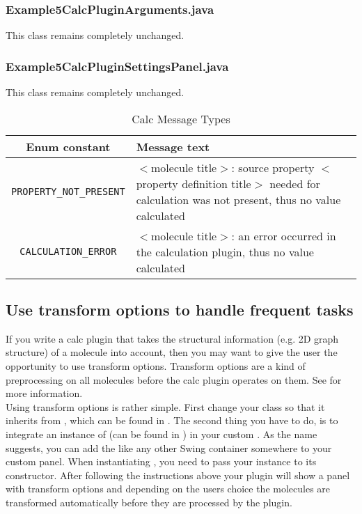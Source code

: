   \subsubsection{Example5CalcPluginArguments.java}
  This class remains completely unchanged.

  \subsubsection{Example5CalcPluginSettingsPanel.java}
  This class remains completely unchanged.

    \begin{table}[!htb]
      \begin{tabular}{cp{10cm}}
	\textbf{Enum constant}		& \textbf{Message text} \\ \toprule
	\verb+PROPERTY_NOT_PRESENT+	& $<$molecule title$>$: source property $<$property definition title$>$ needed for calculation was not present, thus no value calculated\\ \midrule
	\verb+CALCULATION_ERROR+	& $<$molecule title$>$: an error occurred in the calculation plugin, thus no value calculated\\ \bottomrule
      \end{tabular}
      \caption{Calc Message Types}
      \label{Table:scaffoldhunter:calc:CalcMessageTypes}
    \end{table}

\subsection{Use transform options to handle frequent tasks}

If you write a calc plugin that takes the structural
information (e.g. 2D graph structure) of a molecule into account,
then you may want to give the user the opportunity to use transform options.
Transform options are a kind of preprocessing on all molecules before the calc plugin operates on them.
See  for more information.\\

Using transform options is rather simple.
First change your  class
so that it inherits from ,
which can be found in .
The second thing you have to do, is to integrate an instance of 
(can be found in )
in your custom .
As the name suggests, you can add the  like any other Swing container somewhere to your custom panel.
When instantiating ,
you need to pass your  instance to its constructor.
After following the instructions above your plugin will show a panel with transform
options and depending on the users choice the molecules are transformed automatically before they are processed by the plugin.